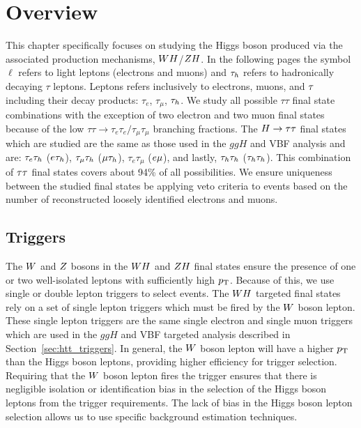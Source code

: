 \section{Overview}
This chapter specifically focuses on studying the Higgs boson produced via the associated
production mechanisms, $WH$/$ZH$.
In the following pages the symbol $\ell$ refers to light leptons (electrons and muons) and $\tau_{h}$ refers to hadronically
decaying $\tau$ leptons. Leptons refers inclusively to electrons, muons, and $\tau$ including their decay products:
$\tau_{e}$, $\tau_{\mu}$, $\tau_{h}$.
We study all possible $\tau\tau$ final state combinations with the
exception of two electron and two muon final states because of the low 
$\tau\tau \to \tau_{e}\tau_{e}/\tau_{\mu}\tau_{\mu}$
branching fractions. The $H\to\tau\tau$ final states which are
studied are the same as those used in the $ggH$ and VBF analysis and are: 
$\tau_{e}\tau_{h}$ ($e\tau_{h}$), $\tau_{\mu}\tau_{h}$ ($\mu\tau_{h}$),
$\tau_{e}\tau_{\mu}$ ($e\mu$), and lastly, $\tau_{h}\tau_{h}$ ($\tau_{h}\tau_{h}$).
This combination of $\tau\tau$ final states covers about 94\% of all possibilities.
We ensure uniqueness between the studied final states be applying veto criteria to events based
on the number of reconstructed loosely identified electrons and muons.



\subsection{Triggers}
The $W$ and $Z$ bosons in the $WH$ and $ZH$ final states ensure the presence of one 
or two well-isolated leptons with sufficiently high $p_\mathrm{T}$. Because of this,
we use single or double lepton triggers to select events.
The $WH$ targeted final states rely on a set of single lepton triggers
which must be fired by the $W$ boson lepton. These single
lepton triggers are the same single electron and single muon triggers which are 
used in the $ggH$ and VBF targeted analysis described in 
Section~\ref{sec:htt_triggers}. In general, the $W$ boson lepton
will have a higher $p_\mathrm{T}$ than the Higgs boson leptons, providing
higher efficiency for trigger selection. Requiring that the $W$
boson lepton fires the trigger ensures that there is negligible
isolation or identification
bias in the selection of the Higgs boson leptons from the trigger
requirements. The lack of bias in the Higgs boson lepton selection 
allows us to use specific background estimation techniques.

